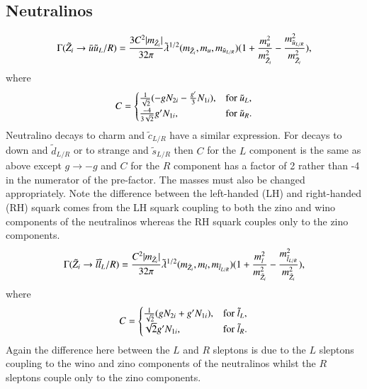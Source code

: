 \documentclass[final,3p,times]{elsarticle}
\begin{document}
\subsection{Neutralinos} \label{Neutralinos}

\begin{equation}\label{neutuuLR}
\Gamma (\tilde{Z}_i \rightarrow \bar{u} \tilde{u}_L/R) = {3 C^2 |m_{\tilde{Z}_i}| \over 32\pi} \tilde{\lambda}^{1/2} (m_{\tilde{Z}_i}, m_u, m_{\tilde{u}_{L/R}}) (1+ {m_{u}^2 \over m_{\tilde{Z}_i}^2}  - {m_{\tilde{u}_{L/R}}^2 \over m_{\tilde{Z}_i}^2}),
\end{equation} 
where
\begin{equation}
  C=\begin{cases}
    {1 \over \sqrt{2}}(-g N_{2i} - {g' \over 3} N_{1i}), & \text{for $\tilde{u}_L$},\\
    {-4 \over 3\sqrt{2}}g' N_{1i}, & \text{for $\tilde{u}_R$}.
  \end{cases}
\end{equation}
Neutralino decays to charm and $\tilde{c}_{L/R}$ have a similar expression.
For decays to down and $\tilde{d}_{L/R}$ or to strange and $\tilde{s}_{L/R}$ then $C$ for the $L$ component is the
same as above except $g \rightarrow -g$ and $C$ for the $R$ component has a factor of 2 rather than -4 in the
numerator of the pre-factor. The masses must also be changed appropriately. Note the
difference between the left-handed (LH) and right-handed
(RH) squark comes from the LH squark coupling to both the zino and
wino components of the neutralinos whereas the RH squark couples only to the zino components.
\begin{equation}\label{neutllLR}
\Gamma (\tilde{Z}_i \rightarrow \bar{l} \tilde{l}_L/R) = {C^2 |m_{\tilde{Z}_i}| \over 32\pi} \tilde{\lambda}^{1/2} (m_{\tilde{Z}_i}, m_l, m_{\tilde{l}_{L/R}}) (1+ {m_{l}^2 \over m_{\tilde{Z}_i}^2}  - {m_{\tilde{l}_{L/R}}^2 \over m_{\tilde{Z}_i}^2}),
\end{equation} 
where
\begin{equation}
  C=\begin{cases}
    {1 \over \sqrt{2}}(g N_{2i} + g' N_{1i}), & \text{for $\tilde{l}_L$},\\
    \sqrt{2} g' N_{1i}, & \text{for $\tilde{l}_R$}.
  \end{cases}
\end{equation}
Again the difference here between the $L$ and $R$ sleptons is due to the $L$ sleptons coupling to the wino
and zino components of the neutralinos whilst the $R$ sleptons couple only to the zino components.
\end{document}
